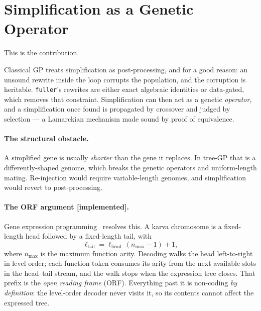 \documentclass[sigconf]{acmart}
\begin{document}
\section{Simplification as a Genetic Operator}
\label{sec:operator}

This is the contribution.

Classical GP treats simplification as post-processing, and for a good reason:
an unsound rewrite inside the loop corrupts the population, and the corruption is
heritable. \texttt{fuller}'s rewrites are either exact algebraic identities or
data-gated, which removes that constraint. Simplification can then act as a
genetic \emph{operator}, and a simplification once found is propagated by
crossover and judged by selection --- a Lamarckian mechanism made sound by proof
of equivalence.

\paragraph{The structural obstacle.} A simplified gene is usually \emph{shorter}
than the gene it replaces. In tree-GP that is a differently-shaped genome, which
breaks the genetic operators and uniform-length mating. Re-injection would
require variable-length genomes, and simplification would revert to
post-processing.

\paragraph{The ORF argument [implemented].} Gene expression
programming~\cite{ferreira2001} resolves this. A karva chromosome is a
fixed-length head followed by a fixed-length tail, with
\begin{equation}
\label{eq:tail}
\ell_{\text{tail}} = \ell_{\text{head}}\,(n_{\max}-1) + 1 ,
\end{equation}
where $n_{\max}$ is the maximum function arity. Decoding walks the head
left-to-right in level order; each function token consumes its arity from the
next available slots in the head--tail stream, and the walk stops when the
expression tree closes. That prefix is the \emph{open reading frame} (ORF).
Everything past it is non-coding \emph{by definition}: the level-order decoder
never visits it, so its contents cannot affect the expressed tree.
\end{document}
